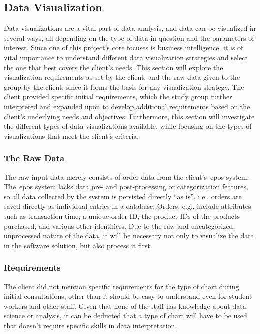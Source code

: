 \subsection{Data Visualization}\label{subsec:data-visualization}

Data visualizations are a vital part of data analysis, and data can be visualized in several ways, all depending on the
type of data in question and the parameters of interest.
Since one of this project's core focuses is business intelligence, it is of vital importance to understand different
data visualization strategies and select the one that best covers the client's needs.
This section will explore the visualization requirements as set by the client, and the raw data given to the group by
the client, since it forms the basis for any visualization strategy.
The client provided specific initial requirements, which the study group further interpreted and expanded upon to
develop additional requirements based on the client's underlying needs and objectives.
Furthermore, this section will investigate the different types of data visualizations available, while focusing on the
types of visualizations that meet the client's criteria.

\subsubsection{The Raw Data}\label{subsubsec:the-client's-raw-data}

The raw input data merely consists of order data from the client's~\acrshort{epos} system.
The~\acrshort{epos} system lacks data pre- and post-processing or categorization features, so all data collected by the
system is persisted directly ``as is'', i.e., orders are saved directly as individual entries in a database.
Orders, e.g., include attributes such as transaction time, a unique order ID, the product IDs of the products purchased,
and various other identifiers.
Due to the raw and uncategorized, unprocessed nature of the data, it will be necessary not only to visualize the data in
the software solution, but also process it first.

\subsubsection{Requirements}\label{subsubsec:requirements}

The client did not mention specific requirements for the type of chart during initial consultations, other than it
should be easy to understand even for student workers and other staff.
Given that none of the staff has knowledge about data science or analysis, it can be deducted that a type of chart will
have to be used that doesn't require specific skills in data interpretation.

